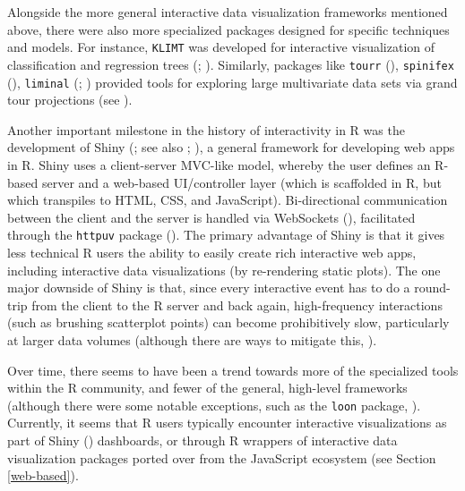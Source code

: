 \documentclass[
]{book}
\theoremstyle{definition}
\theoremstyle{definition}
\theoremstyle{definition}
\theoremstyle{definition}
\theoremstyle{remark}
\begin{document}
Alongside the more general interactive data visualization frameworks mentioned above, there were also more specialized packages designed for specific techniques and models. For instance, \texttt{KLIMT} was developed for interactive visualization of classification and regression trees (; ). Similarly, packages like \texttt{tourr} (), \texttt{spinifex} (), \texttt{liminal} (; ) provided tools for exploring large multivariate data sets via grand tour projections (see ).

Another important milestone in the history of interactivity in R was the development of Shiny (; see also ; ), a general framework for developing web apps in R. Shiny uses a client-server MVC-like model, whereby the user defines an R-based server and a web-based UI/controller layer (which is scaffolded in R, but which transpiles to HTML, CSS, and JavaScript). Bi-directional communication between the client and the server is handled via WebSockets (), facilitated through the \texttt{httpuv} package (). The primary advantage of Shiny is that it gives less technical R users the ability to easily create rich interactive web apps, including interactive data visualizations (by re-rendering static plots). The one major downside of Shiny is that, since every interactive event has to do a round-trip from the client to the R server and back again, high-frequency interactions (such as brushing scatterplot points) can become prohibitively slow, particularly at larger data volumes (although there are ways to mitigate this, ).

Over time, there seems to have been a trend towards more of the specialized tools within the R community, and fewer of the general, high-level frameworks (although there were some notable exceptions, such as the \texttt{loon} package, ). Currently, it seems that R users typically encounter interactive visualizations as part of Shiny () dashboards, or through R wrappers of interactive data visualization packages ported over from the JavaScript ecosystem (see Section \ref{web-based}).
\end{document}
